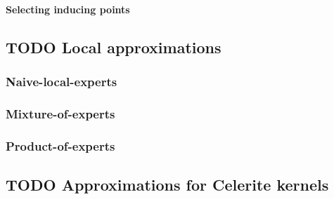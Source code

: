 \paragraph{Selecting inducing points}



\subsection{TODO Local approximations \cite{big-data}}

\subsubsection{Naive-local-experts}

\subsubsection{Mixture-of-experts}

\subsubsection{Product-of-experts}


\subsection{TODO Approximations for Celerite kernels \cite{foreman-mackay}}


% 
% 
% 
% 
% 
% 
